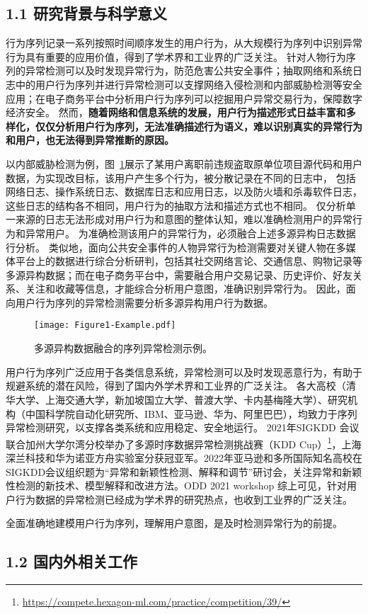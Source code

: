 \subsection{\sihao \kaishu \bfseries 1.1 研究背景与科学意义}

行为序列记录一系列按照时间顺序发生的用户行为，从大规模行为序列中识别异常行为具有重要的应用价值，得到了学术界和工业界的广泛关注。
针对人物行为序列的异常检测可以及时发现异常行为，防范危害公共安全事件；抽取网络和系统日志中的用户行为序列并进行异常检测可以支撑网络入侵检测和内部威胁检测等安全应用；在电子商务平台中分析用户行为序列可以挖掘用户异常交易行为，保障数字经济安全。
然而，\textbf{\songti 随着网络和信息系统的发展，用户行为描述形式日益丰富和多样化，仅仅分析用户行为序列，无法准确描述行为语义，难以识别真实的异常行为和用户，也无法得到异常推断的原因。}

以内部威胁检测为例，图~\ref{fig:example}展示了某用户离职前违规盗取原单位项目源代码和用户数据，为实现改目标，该用户产生多个行为，被分散记录在不同的日志中，
包括网络日志、操作系统日志、数据库日志和应用日志，以及防火墙和杀毒软件日志，这些日志的结构各不相同，用户行为的抽取方法和描述方式也不相同。
仅分析单一来源的日志无法形成对用户行为和意图的整体认知，难以准确检测用户的异常行为和异常用户。
为准确检测该用户的异常行为，必须融合上述多源异构日志数据行分析。
类似地，面向公共安全事件的人物异常行为检测需要对关键人物在多媒体平台上的数据进行综合分析研判，包括其社交网络言论、交通信息、购物记录等多源异构数据；而在电子商务平台中，需要融合用户交易记录、历史评价、好友关系、关注和收藏等信息，才能综合分析用户意图，准确识别异常行为。
因此，面向用户行为序列的异常检测需要分析多源异构用户行为数据。

\begin{figure}[htp]
    \centering
    \texttt{[image: Figure1-Example.pdf]}
    \caption{多源异构数据融合的序列异常检测示例。}
    \label{fig:example}
\end{figure}

用户行为序列广泛应用于各类信息系统，异常检测可以及时发现恶意行为，有助于规避系统的潜在风险，得到了国内外学术界和工业界的广泛关注。
各大高校（清华大学、上海交通大学，新加坡国立大学、普渡大学、卡内基梅隆大学）、研究机构（中国科学院自动化研究所、IBM、亚马逊、华为、阿里巴巴），均致力于序列异常检测研究，以支撑各类系统和应用稳定、安全地运行。
2021年SIGKDD 会议联合加州大学尔湾分校举办了多源时序数据异常检测挑战赛（KDD Cup）\footnote{\url{https://compete.hexagon-ml.com/practice/competition/39/}}，上海深兰科技和华为诺亚方舟实验室分获冠亚军。2022年亚马逊和多所国际知名高校在SIGKDD会议组织题为“异常和新颖性检测、解释和调节”研讨会，关注异常和新颖性检测的新技术、模型解释和改进方法。ODD 2021 workshop
综上可见，针对用户行为数据的异常检测已经成为学术界的研究热点，也收到工业界的广泛关注。

全面准确地建模用户行为序列，理解用户意图，是及时检测异常行为的前提。


\subsection{\sihao \songti \bfseries 1.2 国内外相关工作}


